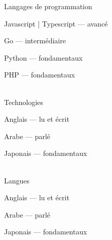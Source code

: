 

\begin{cvskills}

  \cvskill
    {Langages de programmation} %
    {
      \begin{cvitems} %
        \item {Javascript | Typescript — avancé}
        \item {Go — intermédiaire}
        \item {Python — fondamentaux}
        \item {PHP — fondamentaux}
      \end{cvitems}
    }
\\

  \cvskill
    {Technologies} %
    {
      \begin{cvitems} %
        \item {Anglais — lu et écrit}
        \item {Arabe — parlé}
        \item {Japonais — fondamentaux}
      \end{cvitems}
    }
\\

  \cvskill
    {Langues} %
    {
      \begin{cvitems} %
        \item {Anglais — lu et écrit}
        \item {Arabe — parlé}
        \item {Japonais — fondamentaux}
      \end{cvitems}
    }

\end{cvskills}
